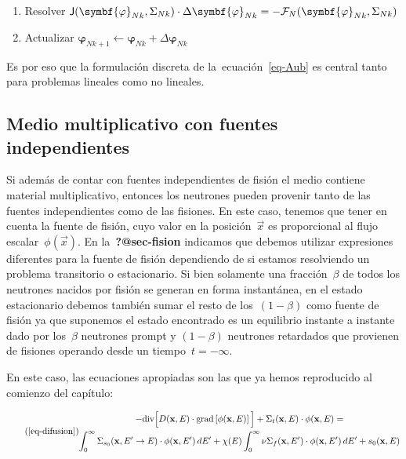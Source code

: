 \documentclass[
  12pt,
  a4paper,
  table]{scrbook}
\providecommand{\tightlist}{%
  \setlength{\itemsep}{0pt}\setlength{\parskip}{0pt}}\usepackage{longtable,booktabs,array}
\theoremstyle{plain}
\theoremstyle{definition}
\theoremstyle{plain}
\theoremstyle{plain}
\theoremstyle{remark}
\begin{document}
\begin{enumerate}
\def\labelenumi{\arabic{enumi}.}
\tightlist
\item
  Resolver
  \(\mat{J}(\symbf{\varphi}_{Nk}, \Sigma_{Nk}) \cdot \Delta \symbf{\varphi}_{Nk} = -\mathcal{F}_N(\symbf{\varphi}_{Nk}, \Sigma_{Nk})\)
\item
  Actualizar
  \(\symbf{\varphi}_{Nk+1} \leftarrow \symbf{\varphi}_{Nk} + \Delta \symbf{\varphi}_{Nk}\)
\end{enumerate}

Es por eso que la formulación discreta de la~ecuación~\ref{eq-Aub} es
central tanto para problemas lineales como no lineales.

\hypertarget{sec-multiplicativoconfuente}{%
\subsection{Medio multiplicativo con fuentes
independientes}\label{sec-multiplicativoconfuente}}

Si además de contar con fuentes independientes de fisión el medio
contiene material multiplicativo, entonces los neutrones pueden provenir
tanto de las fuentes independientes como de las fisiones. En este caso,
tenemos que tener en cuenta la fuente de fisión, cuyo valor en la
posición~\(\vec{x}\) es proporcional al flujo escalar~\(\phi(\vec{x})\).
En la~\textbf{?@sec-fision} indicamos que debemos utilizar expresiones
diferentes para la fuente de fisión dependiendo de si estamos
resolviendo un problema transitorio o estacionario. Si bien solamente
una fracción~\(\beta\) de todos los neutrones nacidos por fisión se
generan en forma instantánea, en el estado estacionario debemos también
sumar el resto de los~\((1-\beta)\) como fuente de fisión ya que
suponemos el estado encontrado es un equilibrio instante a instante dado
por los~\(\beta\) neutrones \foreignlanguage{american}{prompt} y
\((1-\beta)\) neutrones retardados que provienen de fisiones operando
desde un tiempo~\(t=-\infty\).

En este caso, las ecuaciones apropiadas son las que ya hemos reproducido
al comienzo del capítulo:

\[ \tag{\ref{eq-difusion}}
\begin{gathered}
 - \text{div} \Big[ D(\vec{x}, E) \cdot \text{grad} \left[ \phi(\vec{x}, E) \right] \Big]
 + \Sigma_t(\vec{x}, E) \cdot \phi(\vec{x}, E)
 = \\
\int_{0}^{\infty} \Sigma_{s_0}(\vec{x}, E^{\prime} \rightarrow E)  \cdot \phi(\vec{x}, E^\prime) \, dE^\prime +
\chi(E) \int_{0}^{\infty} \nu\Sigma_f(\vec{x}, E^\prime) \cdot \phi(\vec{x}, E^\prime) \, dE^\prime
+ s_0(\vec{x}, E)
\end{gathered}
\]
\end{document}
